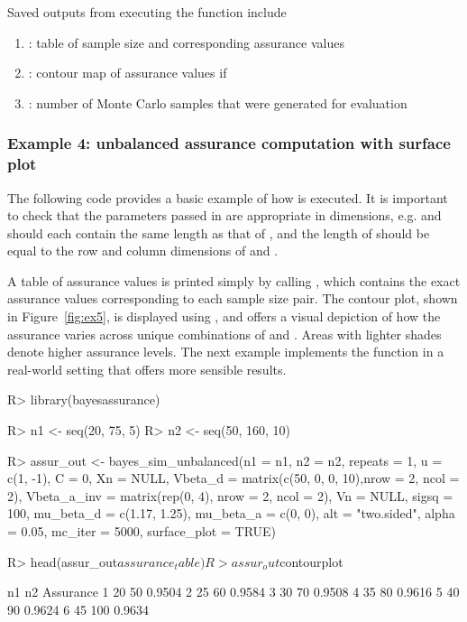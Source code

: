 Saved outputs from executing the function include
\begin{enumerate}
\item{: table of sample size 
and corresponding assurance values}
\item{: contour map of assurance values 
if }
\item{: number of Monte Carlo 
samples that were generated for evaluation}
\end{enumerate}


\subsubsection{Example 4: unbalanced assurance computation with surface plot}

The following code provides a basic example of how
 is executed. It is important to check 
that the parameters passed in are appropriate in dimensions, e.g. 
 and  should each 
contain the same length as that of , and the length of 
 should be equal to the row and column
dimensions of  and .  

A table of assurance values is printed simply
by calling , which contains
the exact assurance values corresponding to each
sample size pair. The contour 
plot, shown in Figure~\ref{fig:ex5}, is displayed
using , and offers a visual
depiction of how the assurance varies across unique
combinations of  and .  Areas 
with lighter shades denote higher assurance levels.
The next example implements the
function in a real-world setting that offers more sensible
results.
\begin{Schunk}
\begin{Sin}
R> library(bayesassurance)

R> n1 <- seq(20, 75, 5)
R> n2 <- seq(50, 160, 10)


R> assur_out <- bayes_sim_unbalanced(n1 = n1, n2 = n2, repeats = 1, u = c(1, -1),
	  C = 0, Xn = NULL, Vbeta_d = matrix(c(50, 0, 0, 10),nrow = 2, ncol = 2),
	  Vbeta_a_inv = matrix(rep(0, 4), nrow = 2, ncol = 2),
	  Vn = NULL, sigsq = 100,  mu_beta_d = c(1.17, 1.25),
	  mu_beta_a = c(0, 0), alt = "two.sided", alpha = 0.05, mc_iter = 5000,
	  surface_plot = TRUE)
				
R> head(assur_out$assurance_table)
R> assur_out$contourplot 

\end{Sin}
\begin{Sout}
  n1  n2 Assurance
1 20  50    0.9504
2 25  60    0.9584
3 30  70    0.9508
4 35  80    0.9616
5 40  90    0.9624
6 45 100    0.9634
\end{Sout}
\end{Schunk}

